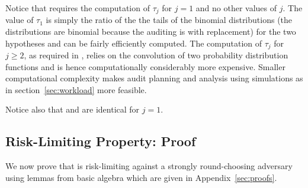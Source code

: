 Notice that \Providence requires the computation of $\tau_j$ for $j=1$ and no other values of $j$. The value of $\tau_1$ is simply the ratio of the the tails of the binomial distributions (the distributions are binomial because the auditing is with replacement) for the two hypotheses and can be fairly efficiently computed. The computation of $\tau_j$ for $j \geq 2$, as required in \Minerva, relies on the convolution of two probability distribution functions and is hence computationally considerably more expensive. Smaller computational complexity makes audit planning and analysis using simulations as in section~\ref{sec:workload} more feasible.

Notice also that \Providence and \Minerva are identical for $j=1$. 

\subsection{Risk-Limiting Property: Proof}
\label{sec:proof}
We now prove that \Providence is risk-limiting against a strongly round-choosing adversary using lemmas from basic algebra which are given in Appendix~\ref{sec:proofs}.

